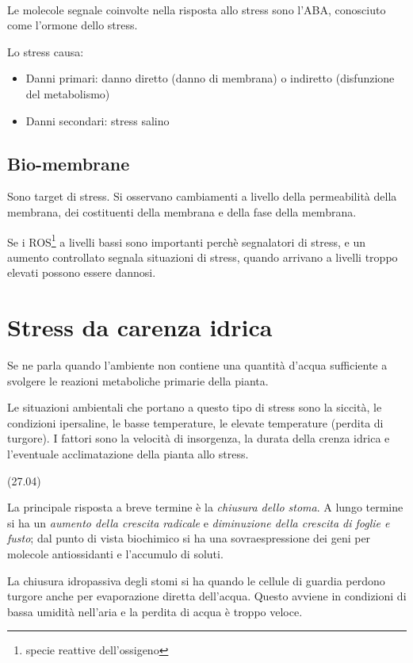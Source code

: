 \documentclass[a4paper,12pt]{book}
\begin{document}
\paragraph{}

Le molecole segnale coinvolte nella risposta allo stress sono l'ABA, conosciuto come l'ormone dello stress.

Lo stress causa:
\begin{itemize}
\item {Danni primari: danno diretto (danno di membrana) o indiretto (disfunzione del metabolismo)}
\item{Danni secondari: stress salino}
\end{itemize}

\subsection{Bio-membrane}
 Sono target di stress.
 Si osservano cambiamenti a livello della permeabilità della membrana, dei costituenti della membrana e della fase della membrana.
 
Se i ROS\footnote{specie reattive dell'ossigeno} a livelli bassi sono importanti perchè segnalatori di stress, e un aumento controllato segnala situazioni di stress, quando arrivano a livelli troppo elevati possono essere dannosi.

\section{Stress da carenza idrica} 
Se ne parla quando l'ambiente non contiene una quantità d'acqua sufficiente a svolgere le reazioni metaboliche primarie della pianta.

Le situazioni ambientali che portano a questo tipo di stress sono la siccità, le condizioni ipersaline, le basse temperature, le elevate temperature (perdita di turgore). I fattori sono la velocità di insorgenza, la durata della crenza idrica e l'eventuale acclimatazione della pianta allo stress.

(27.04)
 
La principale risposta a breve termine è la \emph{chiusura dello stoma}. A lungo termine si ha un \emph{aumento della crescita radicale} e \emph{diminuzione della crescita di foglie e fusto}; dal punto di vista biochimico si ha una sovraespressione dei geni per molecole antiossidanti e l'accumulo di soluti. 
 
La chiusura idropassiva degli stomi si ha quando le cellule di guardia perdono turgore anche per evaporazione diretta dell'acqua. Questo avviene in condizioni di bassa umidità nell'aria e la perdita di acqua è troppo veloce.
\end{document}
